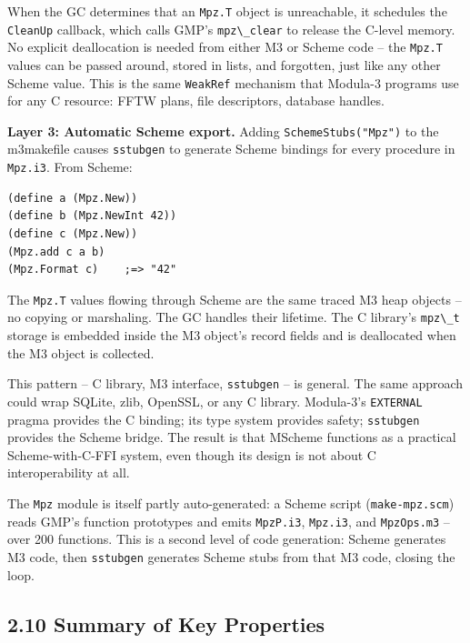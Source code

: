 \documentclass[
  12pt,
]{report}
\newcommand{\passthrough}[1]{#1}
\begin{document}
When the GC determines that an \passthrough{\lstinline!Mpz.T!} object is
unreachable, it schedules the \passthrough{\lstinline!CleanUp!}
callback, which calls GMP's \passthrough{\lstinline!mpz\_clear!} to
release the C-level memory. No explicit deallocation is needed from
either M3 or Scheme code -- the \passthrough{\lstinline!Mpz.T!} values
can be passed around, stored in lists, and forgotten, just like any
other Scheme value. This is the same \passthrough{\lstinline!WeakRef!}
mechanism that Modula-3 programs use for any C resource: FFTW plans,
file descriptors, database handles.

\textbf{Layer 3: Automatic Scheme export.} Adding
\passthrough{\lstinline!SchemeStubs("Mpz")!} to the m3makefile causes
\passthrough{\lstinline!sstubgen!} to generate Scheme bindings for every
procedure in \passthrough{\lstinline!Mpz.i3!}. From Scheme:

\begin{lstlisting}
(define a (Mpz.New))
(define b (Mpz.NewInt 42))
(define c (Mpz.New))
(Mpz.add c a b)
(Mpz.Format c)    ;=> "42"
\end{lstlisting}

The \passthrough{\lstinline!Mpz.T!} values flowing through Scheme are
the same traced M3 heap objects -- no copying or marshaling. The GC
handles their lifetime. The C library's \passthrough{\lstinline!mpz\_t!}
storage is embedded inside the M3 object's record fields and is
deallocated when the M3 object is collected.

This pattern -- C library, M3 interface,
\passthrough{\lstinline!sstubgen!} -- is general. The same approach
could wrap SQLite, zlib, OpenSSL, or any C library. Modula-3's
\passthrough{\lstinline!EXTERNAL!} pragma provides the C binding; its
type system provides safety; \passthrough{\lstinline!sstubgen!} provides
the Scheme bridge. The result is that MScheme functions as a practical
Scheme-with-C-FFI system, even though its design is not about C
interoperability at all.

The \passthrough{\lstinline!Mpz!} module is itself partly
auto-generated: a Scheme script (\passthrough{\lstinline!make-mpz.scm!})
reads GMP's function prototypes and emits
\passthrough{\lstinline!MpzP.i3!}, \passthrough{\lstinline!Mpz.i3!}, and
\passthrough{\lstinline!MpzOps.m3!} -- over 200 functions. This is a
second level of code generation: Scheme generates M3 code, then
\passthrough{\lstinline!sstubgen!} generates Scheme stubs from that M3
code, closing the loop.

\subsection{2.10 Summary of Key
Properties}\label{summary-of-key-properties}
\end{document}
